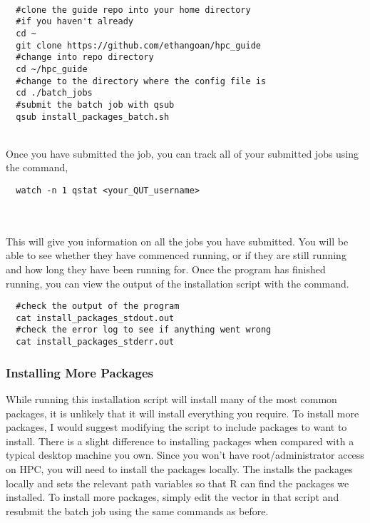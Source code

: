 %
%
\\
\par
\begin{verbatim}
  #clone the guide repo into your home directory
  #if you haven't already
  cd ~
  git clone https://github.com/ethangoan/hpc_guide
  #change into repo directory
  cd ~/hpc_guide
  #change to the directory where the config file is
  cd ./batch_jobs
  #submit the batch job with qsub
  qsub install_packages_batch.sh
\end{verbatim}
\\
%
Once you have submitted the job, you can track all of your submitted jobs using the command,
%
\\
\par
\begin{verbatim}
  watch -n 1 qstat <your_QUT_username>
\end{verbatim}
%
\\
\\
% 
This will give you information on all the jobs you have submitted. You will be able to see whether they have commenced running, or if they are still running and how long they have been running for. Once the program has finished running, you can view the output of the installation script with the  command.
\\
\par
\begin{verbatim}
  #check the output of the program
  cat install_packages_stdout.out
  #check the error log to see if anything went wrong
  cat install_packages_stderr.out
\end{verbatim}
%
%
%
\subsubsection{Installing More Packages}
%
%
While running this installation script will install many of the most common packages, it is unlikely that it will install everything you require. To install more packages, I would suggest modifying the  script to include packages to want to install. There is a slight difference to installing packages when compared with a typical desktop machine you own. Since you won't have root/administrator access on HPC, you will need to install the packages locally. The  installs the packages locally and sets the relevant path variables so that R can find the packages we installed. To install more packages, simply edit the  vector in that script and resubmit the batch job using the same commands as before.
%
%
